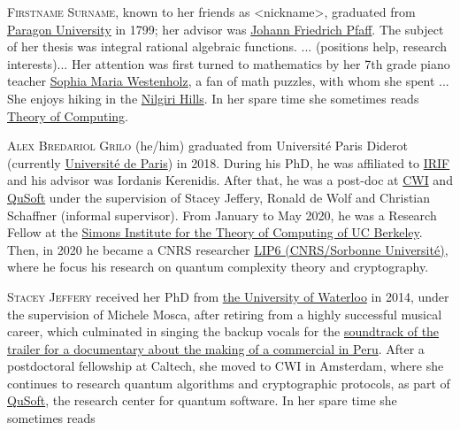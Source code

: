 \begin{tocaboutauthors}
\begin{tocabout}[coladangelo]  %
  \textsc{Firstname Surname}, known to her friends as <nickname>,
  graduated from
  \href{https://en.wikipedia.org/wiki/URL}{Paragon University} in
  1799; her advisor was
  \href{https://en.wikipedia.org/wiki/Johann_Friedrich_Pfaff}{Johann
    Friedrich Pfaff}. The subject of her thesis was integral rational
    algebraic functions.  ... (positions help, research interests)...
    Her attention was first turned to mathematics by her 7th grade
    piano teacher \href{http://url}{Sophia Maria Westenholz},
    a fan of math puzzles, with whom she spent ...  
    She enjoys hiking in the
   \href{https://en.wikipedia.org/wiki/Nilgiri_Mountains/}{Nilgiri Hills}.
    In her spare time she sometimes reads
  \href{http://theoryofcomputing.org}{\textsf{Theory of Computing}}.
\end{tocabout}
\begin{tocabout}[grilo]
\textsc{Alex Bredariol Grilo} (he/him) graduated from   Universit\'{e} Paris Diderot (currently   \href{https://u-paris.fr/en/}{Universit\'e de Paris}) in 2018. During his PhD, he was affiliated to  \href{https://www.irif.fr}{IRIF} and his advisor was Iordanis Kerenidis. After that, he was a post-doc at \href{https://cwi.nl}{CWI} and \href{https://qusoft.nl}{QuSoft} under the supervision of Stacey Jeffery, Ronald de Wolf and Christian Schaffner (informal supervisor). From January to May 2020, he was a Research Fellow at the \href{https://simons.berkeley.edu/}{Simons Institute for the Theory of Computing of UC Berkeley}. Then, in 2020 he became a CNRS researcher  \href{https://lip6.fr}{LIP6 (CNRS/Sorbonne Universit\'e)}, where he focus his research on quantum complexity theory and cryptography.
\end{tocabout}
\begin{tocabout}[jeffery]  %
  \textsc{Stacey Jeffery}
  received her PhD from 
  \href{http://uwaterloo.ca}{the University of Waterloo} in
  2014, under the supervision of Michele Mosca, after retiring from a highly successful musical career, which culminated in singing the backup vocals for the \href{https://www.youtube.com/watch?v=S15lHGMdubI}{soundtrack of the trailer for a documentary about the making of a commercial in Peru}. After a postdoctoral fellowship at Caltech, she moved to CWI in Amsterdam, where she continues to research quantum algorithms and cryptographic protocols, as part of \href{http://qusoft.org}{QuSoft}, the research center for quantum software.     In her spare time she sometimes reads

\end{tocabout}
\end{tocaboutauthors}
